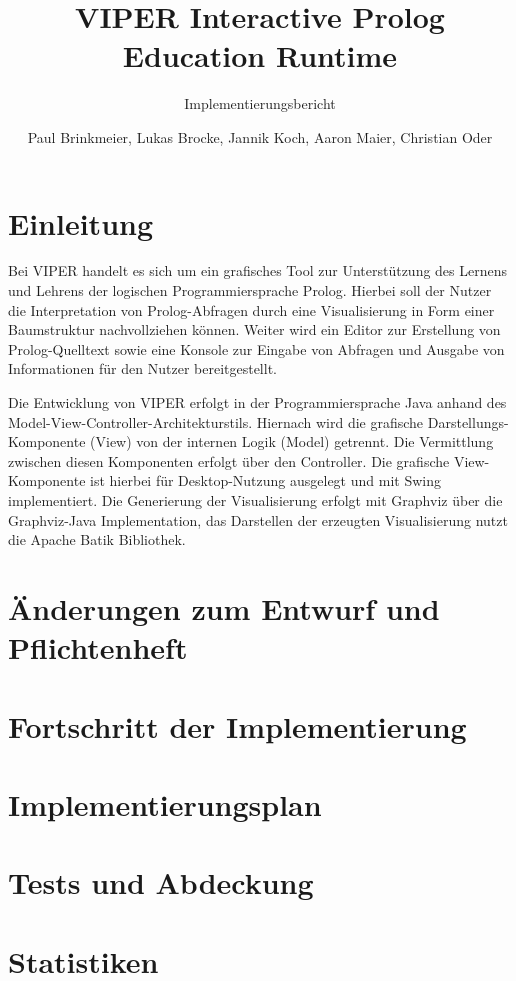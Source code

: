 \documentclass[parskip=full,11pt,twoside]{scrartcl}
\title{VIPER Interactive Prolog Education Runtime}
\subtitle{Implementierungsbericht}
\author{Paul Brinkmeier, Lukas Brocke, Jannik Koch, Aaron Maier, Christian Oder}
\begin{document}
\maketitle
\tableofcontents

\section{Einleitung}
\setcounter{page}{1}

Bei VIPER handelt es sich um ein grafisches Tool zur Unterstützung des Lernens und Lehrens der logischen Programmiersprache Prolog. Hierbei soll der Nutzer die Interpretation von Prolog-Abfragen durch eine Visualisierung in Form einer Baumstruktur nachvollziehen können. Weiter wird ein Editor zur Erstellung von Prolog-Quelltext sowie eine Konsole zur Eingabe von Abfragen und Ausgabe von Informationen für den Nutzer bereitgestellt.

Die Entwicklung von VIPER erfolgt in der Programmiersprache Java anhand des Model-View-Controller-Architekturstils. Hiernach wird die grafische Darstellungs-Komponente (View) von der internen Logik (Model) getrennt. Die Vermittlung zwischen diesen Komponenten erfolgt über den Controller. Die grafische View-Komponente ist hierbei für Desktop-Nutzung ausgelegt und mit Swing implementiert. Die Generierung der Visualisierung erfolgt mit Graphviz über die Graphviz-Java Implementation, das Darstellen der erzeugten Visualisierung nutzt die Apache Batik Bibliothek.

\section{Änderungen zum Entwurf und Pflichtenheft}

\section{Fortschritt der Implementierung}


\section{Implementierungsplan}


\section{Tests und Abdeckung}


\section{Statistiken}

\end{document}
